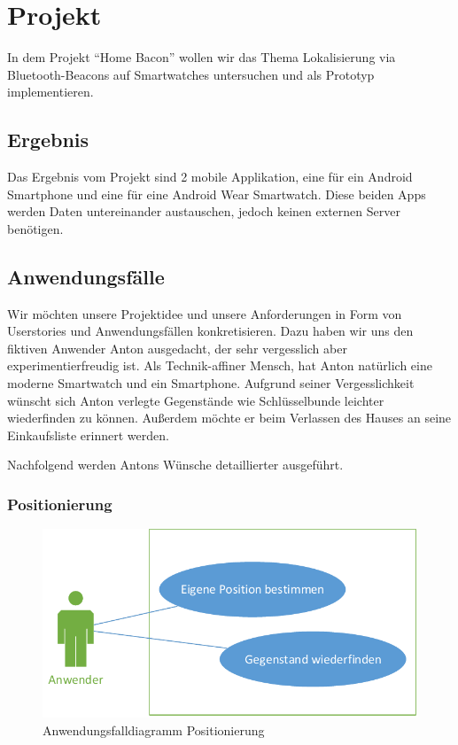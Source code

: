 \section{Projekt}

In dem Projekt "`Home Bacon"' wollen wir das Thema Lokalisierung via
Bluetooth-Beacons auf Smartwatches untersuchen und als Prototyp implementieren.

\subsection{Ergebnis}
Das Ergebnis vom Projekt sind 2 mobile Applikation, eine für ein Android Smartphone und eine für eine Android Wear Smartwatch. Diese beiden Apps werden Daten untereinander austauschen, jedoch keinen externen Server benötigen.

\subsection{Anwendungsfälle}
Wir möchten unsere Projektidee und unsere Anforderungen in Form von Userstories und Anwendungsfällen konkretisieren. Dazu haben wir uns den fiktiven Anwender Anton ausgedacht, der sehr vergesslich aber experimentierfreudig ist. Als Technik-affiner Mensch, hat Anton natürlich eine moderne Smartwatch und ein Smartphone. Aufgrund seiner Vergesslichkeit wünscht sich Anton verlegte Gegenstände wie Schlüsselbunde leichter wiederfinden zu können. Außerdem möchte er beim Verlassen des Hauses an seine Einkaufsliste erinnert werden.

Nachfolgend werden Antons Wünsche detaillierter ausgeführt.

\subsubsection{Positionierung}
\begin{figure}[H]
\centering
\includegraphics[width=0.7\linewidth]{Bilder/UseCase-Position}
\caption{Anwendungsfalldiagramm Positionierung}
\label{fig:UseCase-Position}
\end{figure}

